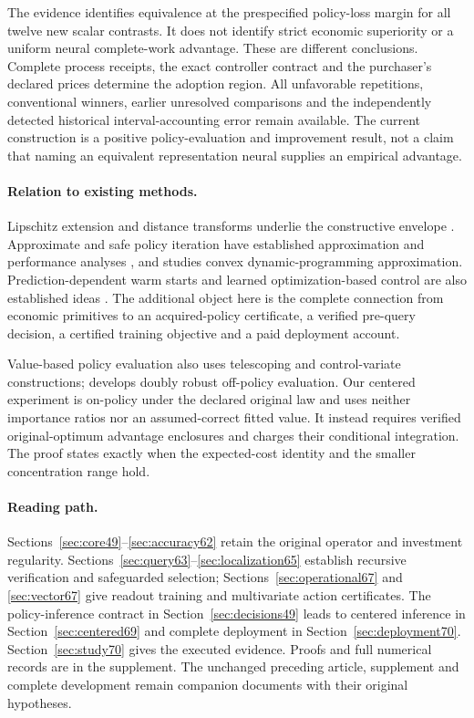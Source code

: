 \documentclass[ecta,nameyear,draft]{econsocart}
\begin{document}
The evidence identifies equivalence at the prespecified policy-loss margin for all twelve new scalar contrasts. It does not identify strict economic superiority or a uniform neural complete-work advantage. These are different conclusions. Complete process receipts, the exact controller contract and the purchaser's declared prices determine the adoption region. All unfavorable repetitions, conventional winners, earlier unresolved comparisons and the independently detected historical interval-accounting error remain available. The current construction is a positive policy-evaluation and improvement result, not a claim that naming an equivalent representation neural supplies an empirical advantage.

\paragraph{Relation to existing methods.}
Lipschitz extension and distance transforms underlie the constructive envelope \citep{mcshane1934,felzenszwalb2012}. Approximate and safe policy iteration have established approximation and performance analyses \citep{munos2003,pirotta2013,scherrer2015}, and \citet{yang2020convex} studies convex dynamic-programming approximation. Prediction-dependent warm starts and learned optimization-based control are also established ideas \citep{sakaue2023warm,sambharya2023,agrawal2020control}. The additional object here is the complete connection from economic primitives to an acquired-policy certificate, a verified pre-query decision, a certified training objective and a paid deployment account.

Value-based policy evaluation also uses telescoping and control-variate constructions; \citet{jiang2016} develops doubly robust off-policy evaluation. Our centered experiment is on-policy under the declared original law and uses neither importance ratios nor an assumed-correct fitted value. It instead requires verified original-optimum advantage enclosures and charges their conditional integration. The proof states exactly when the expected-cost identity and the smaller concentration range hold.

\paragraph{Reading path.}
Sections~\ref{sec:core49}--\ref{sec:accuracy62} retain the original operator and investment regularity. Sections~\ref{sec:query63}--\ref{sec:localization65} establish recursive verification and safeguarded selection; Sections~\ref{sec:operational67} and \ref{sec:vector67} give readout training and multivariate action certificates. The policy-inference contract in Section~\ref{sec:decisions49} leads to centered inference in Section~\ref{sec:centered69} and complete deployment in Section~\ref{sec:deployment70}. Section~\ref{sec:study70} gives the executed evidence. Proofs and full numerical records are in the supplement. The unchanged preceding article, supplement and complete development remain companion documents with their original hypotheses.
\end{document}
